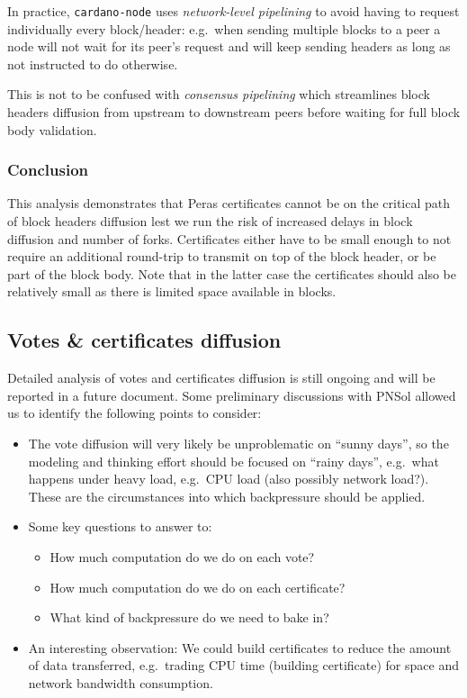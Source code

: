 \documentclass[10pt]{article}
\providecommand{\tightlist}{%
  \setlength{\itemsep}{0pt}\setlength{\parskip}{0pt}}
\begin{document}
\begin{quoting}
 In practice, \texttt{cardano-node} uses \emph{network-level
pipelining} to avoid having to request individually every block/header:
e.g.~when sending multiple blocks to a peer a node will not wait for its
peer's request and will keep sending headers as long as not instructed
to do otherwise.

This is not to be confused with \emph{consensus pipelining} which
streamlines block headers diffusion from upstream to downstream peers
before waiting for full block body validation.
\end{quoting}

\subsubsection{Conclusion}\label{conclusion}

This analysis demonstrates that Peras certificates cannot be on the
critical path of block headers diffusion lest we run the risk of
increased delays in block diffusion and number of forks. Certificates
either have to be small enough to not require an additional round-trip
to transmit on top of the block header, or be part of the block body.
Note that in the latter case the certificates should also be relatively
small as there is limited space available in blocks.

\subsection{Votes \& certificates
diffusion}\label{votes-certificates-diffusion}

Detailed analysis of votes and certificates diffusion is still ongoing
and will be reported in a future document. Some preliminary discussions
with PNSol allowed us to identify the following points to consider:

\begin{itemize}
\tightlist
\item
  The vote diffusion will very likely be unproblematic on ``sunny
  days'', so the modeling and thinking effort should be focused on
  ``rainy days'', e.g.~what happens under heavy load, e.g.~CPU load
  (also possibly network load?). These are the circumstances into which
  backpressure should be applied.
\item
  Some key questions to answer to:

  \begin{itemize}
  \tightlist
  \item
    How much computation do we do on each vote?
  \item
    How much computation do we do on each certificate?
  \item
    What kind of backpressure do we need to bake in?
  \end{itemize}
\item
  An interesting observation: We could build certificates to reduce the
  amount of data transferred, e.g.~trading CPU time (building
  certificate) for space and network bandwidth consumption.
\end{itemize}
\end{document}
